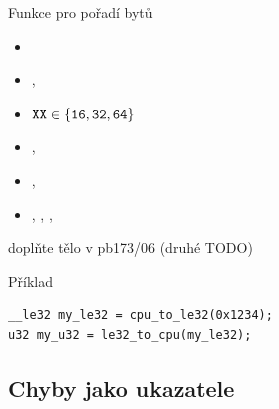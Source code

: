 \begin{frame}[fragile]{Funkce pro pořadí bytů}

  \begin{itemize}
    \item {}
    \item {}, 
    \item $\text{\code{XX}}\in\left\{\text{\code{16}},\text{\code{32}},\text{\code{64}}\right\}$

    \pause

    \item {}, 
    \item {}, 

    \pause

    \item {}, , , 
  \end{itemize}

  \pause
  \bigskip

   doplňte tělo  v pb173/06 (druhé TODO)


  \begin{block}{Příklad}
    \begin{lstlisting}
__le32 my_le32 = cpu_to_le32(0x1234);
u32 my_u32 = le32_to_cpu(my_le32);
    \end{lstlisting}
  \end{block}

\end{frame}

\iffimuni
\subsection{Chyby jako ukazatele}
\fi

